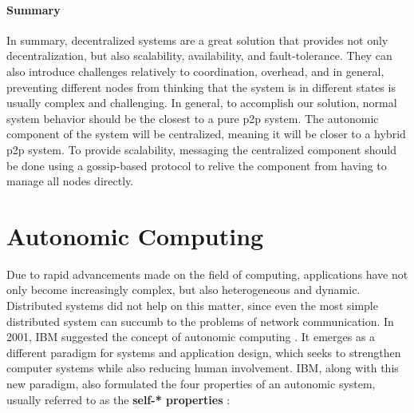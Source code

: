 \paragraph{Summary} In summary, decentralized systems are a great solution that provides not only decentralization, but also scalability, availability, and fault-tolerance. They can also introduce challenges relatively to coordination, overhead, and in general, preventing different nodes from thinking that the system is in different states is usually complex and challenging. %
In general, to accomplish our solution, normal system behavior should be the closest to a pure \gls{p2p} system. The autonomic component of the system will be centralized, meaning it will be closer to a hybrid \gls{p2p} system. To provide scalability, messaging the centralized component should be done using a gossip-based protocol to relive the component from having to manage all nodes directly.
%                                                     
\section{Autonomic Computing}
\label{sec:autonomiccomputing}
\par Due to rapid advancements made on the field of computing, applications have not only become increasingly complex, but also heterogeneous and dynamic. Distributed systems did not help on this matter, since even the most simple distributed system can succumb to the problems of network communication. In 2001, IBM suggested the concept of autonomic computing \cite{Horn2001}. It emerges as a different paradigm for systems and application design, which seeks to strengthen computer systems while also reducing human involvement. IBM, along with this new paradigm, also formulated the four properties of an autonomic system, usually referred to as the \textbf{self-* properties} \cite{Huebscher2008}:
